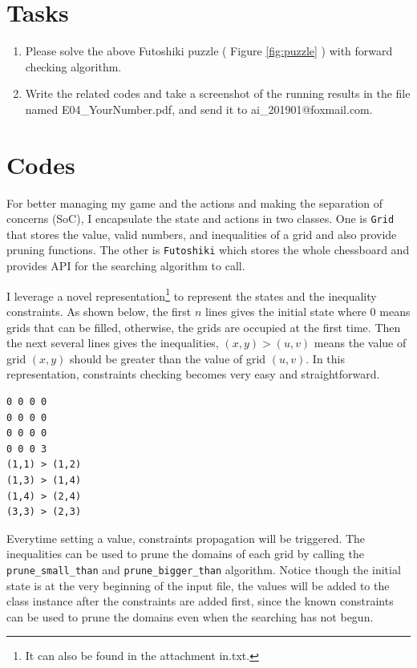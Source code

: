 ﻿\documentclass[a4paper, 11pt]{article}
\begin{document}
\section{Tasks}
\begin{enumerate}
\item Please solve the above Futoshiki puzzle ( Figure \ref{fig:puzzle} ) with forward checking algorithm.
\item Write the related codes and take a screenshot of the running results in the file named \textsf{E04\_YourNumber.pdf}, and send it to \textsf{ai\_201901@foxmail.com}.
\end{enumerate}

\section{Codes}
For better managing my game and the actions and making the separation of concerns (SoC), I encapsulate the state and actions in two classes.
One is \verb'Grid' that stores the value, valid numbers, and inequalities of a grid and also provide pruning functions.
The other is \verb'Futoshiki' which stores the whole chessboard and provides API for the searching algorithm to call.

I leverage a novel representation\footnote{It can also be found in the attachment \textsf{in.txt}.} to represent the states and the inequality constraints.
As shown below, the first $n$ lines gives the initial state where $0$ means grids that can be filled, otherwise, the grids are occupied at the first time.
Then the next several lines gives the inequalities, $(x,y)>(u,v)$ means the value of grid $(x,y)$ should be greater than the value of grid $(u,v)$.
In this representation, constraints checking becomes very easy and straightforward.
\begin{lstlisting}
0 0 0 0
0 0 0 0
0 0 0 0
0 0 0 3
(1,1) > (1,2)
(1,3) > (1,4)
(1,4) > (2,4)
(3,3) > (2,3)
\end{lstlisting}

Everytime setting a value, constraints propagation will be triggered.
The inequalities can be used to prune the domains of each grid by calling the \verb'prune_small_than' and \verb'prune_bigger_than' algorithm.
Notice though the initial state is at the very beginning of the input file, the values will be added to the class instance after the constraints are added first, since the known constraints can be used to prune the domains even when the searching has not begun.
\end{document}
